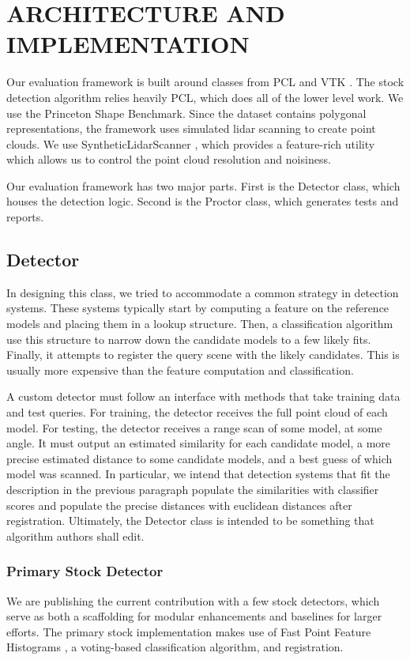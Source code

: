 \section{ARCHITECTURE AND IMPLEMENTATION}
Our evaluation framework is built around classes from PCL \cite{PCL} and VTK \cite{vtk}.
The stock detection algorithm relies heavily PCL, which does all of the lower level work.
We use the Princeton Shape Benchmark.
Since the dataset contains polygonal representations, the framework uses simulated lidar scanning to create point clouds. We use SyntheticLidarScanner \cite{Doria2009}, which provides a feature-rich utility which allows us to control the point cloud resolution and noisiness.

Our evaluation framework has two major parts. First is the Detector class, which houses the detection logic. Second is the Proctor class, which generates tests and reports.


\subsection{Detector}
In designing this class, we tried to accommodate a common strategy in detection systems.
These systems typically start by computing a feature on the reference models and placing them in a lookup structure.
Then, a classification algorithm use this structure to narrow down the candidate models to a few likely fits.
Finally, it attempts to register the query scene with the likely candidates. This is usually more expensive than the feature computation and classification.

A custom detector must follow an interface with methods that take training data and test queries.
For training, the detector receives the full point cloud of each model.
For testing, the detector receives a range scan of some model, at some angle. It must output an estimated similarity for each candidate model, a more precise estimated distance to some candidate models, and a best guess of which model was scanned.
In particular, we intend that detection systems that fit the description in the previous paragraph populate the similarities with classifier scores and populate the precise distances with euclidean distances after registration.
Ultimately, the Detector class is intended to be something that algorithm authors shall edit.

\subsubsection{Primary Stock Detector}
We are publishing the current contribution with a few stock detectors, which serve as both a scaffolding for modular enhancements and baselines for larger efforts.
The primary stock implementation makes use of Fast Point Feature Histograms \cite{fpfh1, fpfh2}, a voting-based classification algorithm, and registration.

